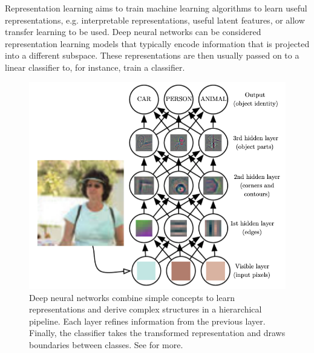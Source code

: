 Representation learning aims to train machine learning algorithms to learn useful representations, e.g. interpretable representations, useful latent features, or allow transfer learning to be used. 
Deep neural networks can be considered representation learning models that typically encode information that is projected into a different subspace. These representations are then usually passed on to a linear classifier to, for instance, train a classifier. 
\begin{figure}[h]
    \centering
    \includegraphics[scale=0.4]{chapters/assets/ssl_figs/ssl_rep_learning_images.png}
    \caption{Deep neural networks combine simple concepts to learn representations and derive complex structures in a hierarchical pipeline. Each layer refines  information from the previous layer. Finally, the  classifier takes the transformed representation and draws boundaries between classes. See  for more.}
    \label{fig:small-cnn-features}
\end{figure}

